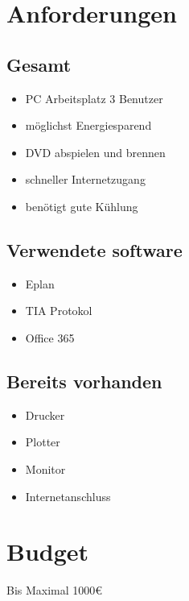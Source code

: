 \tableofcontents
\newpage
\section{Anforderungen}
\label{sec:org0b5b6ae}
\subsection{Gesamt}
\label{sec:org43dab8e}
\begin{itemize}
\item PC Arbeitsplatz 3 Benutzer
\item möglichst Energiesparend
\item DVD abspielen und brennen
\item schneller Internetzugang
\item benötigt gute Kühlung
\end{itemize}

\subsection{Verwendete software}
\label{sec:org8bc8617}
\begin{itemize}
\item Eplan
\item TIA Protokol
\item Office 365
\end{itemize}

\subsection{Bereits vorhanden}
\label{sec:org897e46c}
\begin{itemize}
\item Drucker
\item Plotter
\item Monitor
\item Internetanschluss
\end{itemize}




\section{Budget}
\label{sec:orgb75aa0b}
Bis Maximal 1000€
